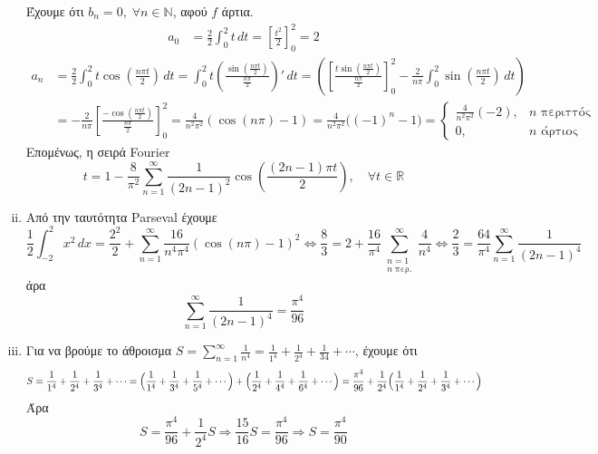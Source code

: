 \documentclass[a4paper,table]{report}
\begin{document}
\begin{solution}
\begin{enumerate}[i)]
      Έχουμε ότι $ b_{n}=0 , \; \forall n \in \mathbb{N} $, 
      αφού $f$ άρτια.  
      \begin{align*}
        a_{0} &= \frac{2}{2} \int _{0}^{2} t \,{dt} = 
        \left[\frac{t^{2}}{2}\right]_{0}^{2} = 2
      \end{align*}
      \begin{align*}
        a_{n} &= \frac{2}{2} \int _{0}^{2} t \cos{\left(\frac{n \pi t}{2}\right)}
        \,{dt} = \int _{0}^{2} t \left(
        \frac{\sin{(\frac{n \pi t}{2})}}{\frac{n \pi}{2}}\right)' \,{dt} =
        \left(\left[ \frac{t \sin{(\frac{n \pi t}{2})}}{\frac{n \pi}{2}}
          \right]_{0}^{2} - \frac{2}{n \pi}\int _{0}^{2}
        \sin{\left(\frac{n \pi t}{2}\right)} \,{dt}\right) \\
              &= -\frac{2}{n \pi}  
              \left[\frac{-\cos{(\frac{n \pi t}{2})}}{\frac{n \pi}{2}}
              \right]_{0}^{2} = \frac{4}{n^{2} \pi^{2}} (\cos{(n \pi)} - 1) = 
              \frac{4}{n^{2} \pi^{2}} \bigl((-1)^{n}- 1\bigr) = 
              \begin{cases}
                \frac{4}{n^{2} \pi ^{2}} (-2) , & \text{$n$ περιττός} \\
                0, & \text{$n$ άρτιος}
              \end{cases}
      \end{align*}
      Επομένως, η σειρά \textlatin{Fourier}
      \[
        t = 1 - \frac{8}{\pi^{2}} \sum_{n=1}^{\infty} \frac{1}{(2n-1)^{2}}
        \cos{\left(\frac{(2n-1) \pi t}{2}\right)}, 
        \quad \forall t \in \mathbb{R} 
      \] 
    \item Από την ταυτότητα \textlatin{Parseval} έχουμε
      \[
        \frac{1}{2} \int _{-2}^{2} x^{2} \,{dx} = \frac{2^{2}}{2} +
        \sum_{n=1}^{\infty} \frac{16}{n^{4} \pi ^{4}} (\cos{{ (n \pi )-1 }})^{2} 
        \Leftrightarrow \frac{8}{3} = 2 + \frac{16}{\pi ^{4}}
        \sum_{\substack{n=1 \\ n \; \text{περ.}}}^{\infty} 
        \frac{4}{n^{4}}  
        \Leftrightarrow \frac{2}{3} = \frac{64}{\pi ^{4}} \sum_{n=1}^{\infty}
        \frac{1}{(2n-1)^{4}} 
      \] 
      άρα 
      \[
        \sum_{n=1}^{\infty} \frac{1}{(2n-1)^{4}} = \frac{\pi^{4}}{96}
      \]
    \item 
      Για να βρούμε το άθροισμα 
      $ S = \sum_{n=1}^{\infty} \frac{1}{n^{4}} = \frac{1}{1^{4}} + \frac{1}{2^{4}} +
      \frac{1}{3{4}} + \cdots $, έχουμε ότι 
      \[
        S =   \frac{1}{1^{4}} + \frac{1}{2^{4}} + \frac{1}{3^{4}} + \cdots =
        \Bigl(\frac{1}{1^{4}} + \frac{1}{3^{4}} + \frac{1}{5^{4}} + \cdots\Bigr) +
        \Bigl(\frac{1}{2^{4}} + \frac{1}{4^{4}} + \frac{1}{6^{4}} + \cdots\Bigr) 
        = \frac{\pi ^{4}}{96} + 
        \frac{1}{2^{4}} \Bigl(\frac{1}{1^{4}} + \frac{1}{2^{4}} + \frac{1}{3^{4}} +
        \cdots\Bigr) 
      \]
      Άρα
      \[
      S = \frac{\pi ^{4}}{96} + \frac{1}{2^{4}} S \Rightarrow \frac{15}{16}S
      = \frac{\pi ^{4}}{96} \Rightarrow S = \frac{\pi ^{4}}{90}
      \]
  \end{enumerate}
\end{solution} 


\end{document}
